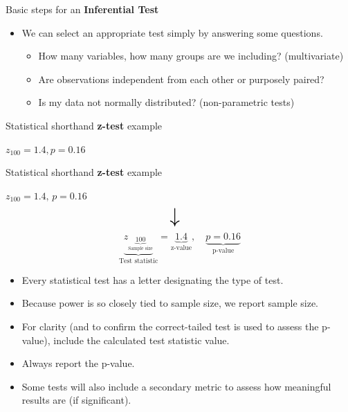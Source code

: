 \documentclass[
  ignorenonframetext,
]{beamer}
\providecommand{\tightlist}{%
  \setlength{\itemsep}{0pt}\setlength{\parskip}{0pt}}
\begin{document}
\begin{frame}{Basic steps for an \textbf{Inferential Test}}
\label{basic-steps-for-an-inferential-test-2}
\begin{itemize}
\item
  We can select an appropriate test simply by answering some questions.

  \begin{itemize}
  \item
    How many variables, how many groups are we including? (multivariate)
  \item
    Are observations independent from each other or purposely paired?
  \item
    Is my data not normally distributed? (non-parametric tests)
  \end{itemize}
\end{itemize}
\end{frame}

\begin{frame}{Statistical shorthand \textbf{z-test} example}
\label{statistical-shorthand-z-test-example}
\centering

\(z_{100} = 1.4, p = 0.16\)\\
\end{frame}

\begin{frame}{Statistical shorthand \textbf{z-test} example}
\label{statistical-shorthand-z-test-example-1}
\centering

\(z_{100} = 1.4, \, p = 0.16\) \[
\text{\huge $\downarrow$} \quad
\] \centering \[
\underbrace{z_{\underbrace{100}_{\text{Sample size}}}}_{\text{Test statistic}} = \underbrace{1.4}_{\text{z-value}}, \quad \underbrace{p = 0.16}_{\text{p-value}}
\]

\begin{itemize}
\tightlist
\item
  Every statistical test has a letter designating the type of test.
\item
  Because power is so closely tied to sample size, we report sample
  size.
\item
  For clarity (and to confirm the correct-tailed test is used to assess
  the p-value), include the calculated test statistic value.
\item
  Always report the p-value.
\item
  Some tests will also include a secondary metric to assess how
  meaningful results are (if significant).
\end{itemize}
\end{frame}
\end{document}
